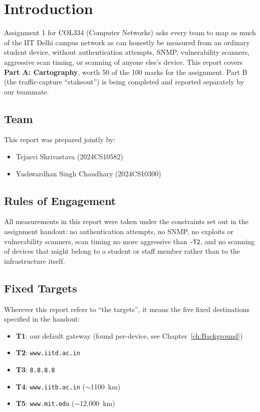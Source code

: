 \setcounter{chapter}{-1}
\chapter{Introduction}
 \setcounter{page}{1}

Assignment 1 for COL334 (Computer Networks) asks every team to map as much of the IIT Delhi
campus network as can honestly be measured from an ordinary student device, without
authentication attempts, SNMP, vulnerability scanners, aggressive scan timing, or scanning of
anyone else's device. This report covers \textbf{Part A: Cartography}, worth 50 of the 100
marks for the assignment. Part B (the traffic-capture ``stakeout'') is being completed and
reported separately by our teammate.

\section{Team}
This report was prepared jointly by:
\begin{itemize}
    \item Tejasvi Shrivastava (2024CS10582)
    \item Yashwardhan Singh Chaudhary (2024CS10300)
\end{itemize}

\section{Rules of Engagement}
All measurements in this report were taken under the constraints set out in the assignment
handout: no authentication attempts, no SNMP, no exploits or vulnerability scanners, scan
timing no more aggressive than \texttt{-T2}, and no scanning of devices that might belong to a
student or staff member rather than to the infrastructure itself.

\section{Fixed Targets}
Wherever this report refers to ``the targets'', it means the five fixed destinations specified in
the handout:
\begin{itemize}
    \item \textbf{T1}: our default gateway (found per-device, see Chapter~\ref{ch:Background})
    \item \textbf{T2}: \texttt{www.iitd.ac.in}
    \item \textbf{T3}: \texttt{8.8.8.8}
    \item \textbf{T4}: \texttt{www.iitb.ac.in} ($\sim$1100~km)
    \item \textbf{T5}: \texttt{www.mit.edu} ($\sim$12{,}000~km)
\end{itemize}

